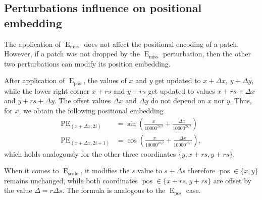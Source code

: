 \documentclass[10pt,twocolumn,letterpaper]{article}
\DeclareMathOperator{\E}{E}
\DeclareMathOperator{\miss}{miss}
\DeclareMathOperator{\scale}{scale}
\DeclareMathOperator{\pos}{pos}
\DeclareMathOperator{\PE}{PE}
\begin{document}
\subsection{Perturbations influence on positional embedding}

The application of $\E_{\miss}$ does not affect the positional encoding of a patch. However, if a patch was not dropped by the $\E_{\miss}$ perturbation, then the other two perturbations can modify its position embedding.

After application of $\E_{\pos}$, the values of $x$ and $y$ get updated to $x+ \Delta x$, $y+\Delta y$, while the lower right corner $x+rs$ and $y+rs$ get updated to values $x + rs + \Delta x$ and $y + rs + \Delta y$. The offset values $\Delta x$ and $\Delta y$ do not depend on $x$ nor $y$. Thus, for $x$, we obtain the following positional embedding
\begin{align*}
    \PE_{(x + \Delta x,2i)} &= \sin\left(\frac{x}{10000^{2i/l}} + \frac{\Delta x}{10000^{2i/l}}\right) \\
    \PE_{(x + \Delta x,2i+1)} &= \cos\left(\frac{x}{10000^{2i/l}} + \frac{\Delta x}{10000^{2i/l}}\right),
\end{align*}
which holds analogously for the other three coordinates $\{y, x+rs, y+rs\}$.

When it comes to $\E_{\scale}$, it modifies the $s$ value to $s + \Delta s$ therefore $\pos \in \{x, y\}$ remains unchanged, while both coordinates $\pos \in \{x + rs, y + rs\}$ are offset by the value $\Delta = r\Delta s$. The formula is analogous to the $\E_{\pos}$ case.
\end{document}
